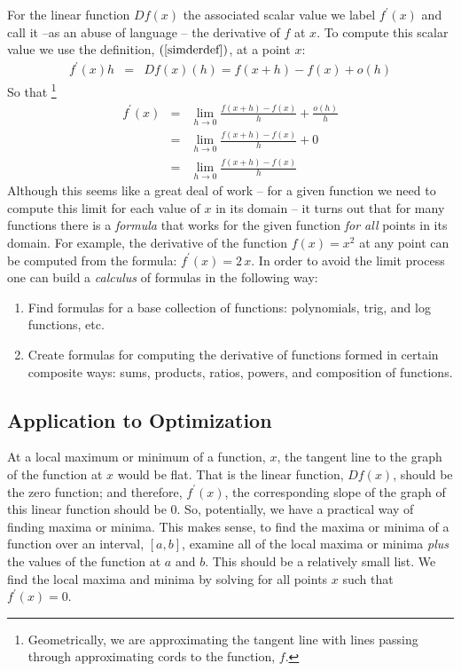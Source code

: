 \documentclass{article}
\begin{document}
For the linear function $Df(x)$ the associated scalar value we label $f^\prime(x)$
and call it --as an abuse of language -- the derivative of $f$ at $x$.
To compute this scalar value we use the definition, $(\ref{simderdef})$, at a point $x$:
\begin{eqnarray}
  f^\prime(x) h & = & Df(x)(h) = f(x+h) - f(x) + o(h)
\end{eqnarray}
So that%
\footnote{Geometrically, we are approximating the tangent line with lines passing
through approximating cords to the function, $f$.}
\begin{eqnarray}
  f^\prime(x) & = & \lim_{h \rightarrow 0} \frac{f(x+h) - f(x)}{h} + \frac{o(h)}{h} \nonumber \\
  & = & \lim_{h \rightarrow 0} \frac{f(x+h) - f(x)}{h} + 0 \nonumber \\
  & = & \lim_{h \rightarrow 0} \frac{f(x+h) - f(x)}{h}
\end{eqnarray}
Although this seems like a great deal of work -- for a given function we need to
compute this limit for each value of $x$ in its domain -- it turns out that for
many functions there is a {\em formula\/} that works for the given function
{\em for all\/}
points in its domain. For example, the derivative of the
function $f(x) = x^2$ at any point can be computed from the formula:
$f^\prime(x) = 2\, x$. In order to avoid the limit process one can build a
{\em calculus\/} of formulas in the following way:
\begin{enumerate}
\item{Find formulas for a base collection of functions: polynomials, trig, and log
functions, etc.}
\item{Create formulas for computing the derivative of functions formed in certain
composite ways: sums, products, ratios, powers, and composition of functions.}
\end{enumerate}

\subsection{Application to Optimization}
At a local maximum or minimum of a function, $x$, the tangent line to
the graph of the function at $x$ would be flat. That is the linear function, $Df(x)$,
should be the zero function; and therefore, $f^\prime(x)$, the corresponding
slope of the graph of this linear function should be $0$.
So, potentially, we have a practical way of finding maxima or minima.
This makes sense, to find the maxima or minima of a function over an interval, $[a,b]$,
examine all of the local maxima or minima {\em plus\/} the values of the function
at $a$ and $b$. This should be a relatively small list. We find the local maxima
and minima by solving for all points $x$ such that $f^\prime(x) = 0$.
\end{document}
